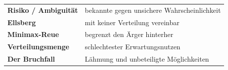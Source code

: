 \begin{merksatz}
\begin{center}
\renewcommand{\arraystretch}{1.5}
\begin{tabular}{@{}P{3.4cm}P{5.2cm}@{}}
\toprule
\textbf{Risiko / Ambiguität} & bekannte gegen unsichere Wahrscheinlichkeit\\
\textbf{Ellsberg} & mit keiner Verteilung vereinbar\\
\textbf{Minimax-Reue} & begrenzt den Ärger hinterher\\
\textbf{Verteilungs\-menge} & schlechtester Erwartungsnutzen\\
\textbf{Der Bruchfall} & Lähmung und unbeteiligte Möglichkeiten\\
\bottomrule
\end{tabular}
\end{center}

\begin{center}
\begin{minipage}{0.88\textwidth}
\end{minipage}
\end{center}
\end{merksatz}
